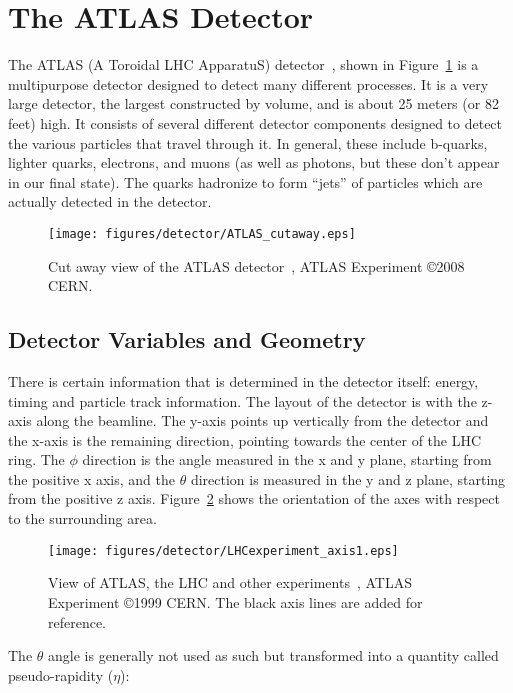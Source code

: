 \section{The ATLAS Detector}
The ATLAS (A Toroidal LHC ApparatuS) detector~\cite{ATLASoverview}, shown in Figure~\ref{fig:ATLAS} is a multipurpose detector designed to detect many different processes.  It is a very large detector, the largest constructed by volume, and is about 25 meters (or 82 feet) high.  It consists of several different detector components designed to detect the various particles that travel through it.  In general, these include b-quarks, lighter quarks, electrons, and muons (as well as photons, but these don't appear in our final state).  The quarks hadronize to form ``jets'' of particles which are actually detected in the detector.
\begin{figure}[!htpb]
  \centering
    \texttt{[image: figures/detector/ATLAS\_cutaway.eps]}
    \label{fig:ATLAS} 
\caption{Cut away view of the ATLAS detector~\cite{ATLASoverview}, ATLAS Experiment \copyright 2008 CERN.}
\end{figure}

\subsection{Detector Variables and Geometry}
There is certain information that is determined in the detector itself: energy, timing and particle track information.  The layout of the detector is with the z-axis along the beamline.  The y-axis points up vertically from the detector and the x-axis is the remaining direction, pointing towards the center of the LHC ring.  The $\phi$ direction is the angle measured in the x and y plane, starting from the positive x axis, and the $\theta$ direction is measured in the y and z plane, starting from the positive z axis.  Figure~\ref{fig:ATLASGEO} shows the orientation of the axes with respect to the surrounding area.

\begin{figure}[!htpb]
  \centering
    \texttt{[image: figures/detector/LHCexperiment\_axis1.eps]}
    \label{fig:ATLASGEO} 
\caption{View of ATLAS, the LHC and other experiments~\cite{ATLASaxes}, ATLAS Experiment \copyright 1999 CERN.  The black axis lines are added for reference.}
\end{figure}

The $\theta$ angle is generally not used as such but transformed into a quantity called pseudo-rapidity ($\eta$):

